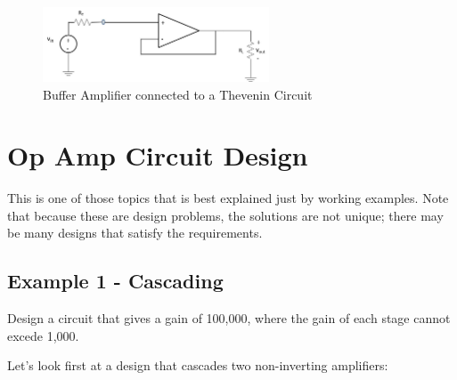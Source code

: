 \documentclass{handout}
\begin{document}
\begin{figure} [h!]
\centering
\includegraphics[width=0.6\textwidth]{Buffer.jpg}
\caption{Buffer Amplifier connected to a Thevenin Circuit}
\label{fig: Buffer}
\end{figure}

\newpage
\clearpage
\pagebreak

\section{Op Amp Circuit Design}
This is one of those topics that is best explained just by working examples. Note that because these are design problems, the solutions are not unique; there may be many designs that satisfy the requirements.

\subsection{Example 1 - Cascading}
Design a circuit that gives a gain of 100,000, where the gain of each stage cannot excede 1,000.



Let's look first at a design that cascades two non-inverting amplifiers:
\end{document}
